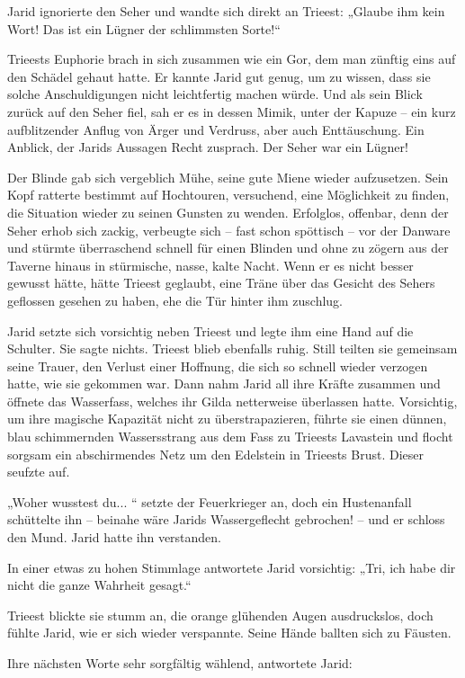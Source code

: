 Jarid ignorierte den Seher und wandte sich direkt an Trieest: „Glaube ihm kein Wort! Das ist ein Lügner der schlimmsten Sorte!“

Trieests Euphorie brach in sich zusammen wie ein Gor, dem man zünftig eins auf den Schädel gehaut hatte. Er kannte Jarid gut genug, um zu wissen, dass sie solche Anschuldigungen nicht leichtfertig machen würde. Und als sein Blick zurück auf den Seher fiel, sah er es in dessen Mimik, unter der Kapuze – ein kurz aufblitzender Anflug von Ärger und Verdruss, aber auch Enttäuschung. Ein Anblick, der Jarids Aussagen Recht zusprach. Der Seher war ein Lügner!

Der Blinde gab sich vergeblich Mühe, seine gute Miene wieder aufzusetzen. Sein Kopf ratterte bestimmt auf Hochtouren, versuchend, eine Möglichkeit zu finden, die Situation wieder zu seinen Gunsten zu wenden. Erfolglos, offenbar, denn der Seher erhob sich zackig, verbeugte sich – fast schon spöttisch – vor der Danware und stürmte überraschend schnell für einen Blinden und ohne zu zögern aus der Taverne hinaus in stürmische, nasse, kalte Nacht. Wenn er es nicht besser gewusst hätte, hätte Trieest geglaubt, eine Träne über das Gesicht des Sehers geflossen gesehen zu haben, ehe die Tür hinter ihm zuschlug.

Jarid setzte sich vorsichtig neben Trieest und legte ihm eine Hand auf die Schulter. Sie sagte nichts. Trieest blieb ebenfalls ruhig. Still teilten sie gemeinsam seine Trauer, den Verlust einer Hoffnung, die sich so schnell wieder verzogen hatte, wie sie gekommen war. Dann nahm Jarid all ihre Kräfte zusammen und öffnete das Wasserfass, welches ihr Gilda netterweise überlassen hatte. Vorsichtig, um ihre magische Kapazität nicht zu überstrapazieren, führte sie einen dünnen, blau schimmernden Wassersstrang aus dem Fass zu Trieests Lavastein und flocht sorgsam ein abschirmendes Netz um den Edelstein in Trieests Brust. Dieser seufzte auf.

„Woher wusstest du... “ setzte der Feuerkrieger an, doch ein Hustenanfall schüttelte ihn – beinahe wäre Jarids Wassergeflecht gebrochen! – und er schloss den Mund. Jarid hatte ihn verstanden.

In einer etwas zu hohen Stimmlage antwortete Jarid vorsichtig: „Tri, ich habe dir nicht die ganze Wahrheit gesagt.“

Trieest blickte sie stumm an, die orange glühenden Augen ausdruckslos, doch fühlte Jarid, wie er sich wieder verspannte. Seine Hände ballten sich zu Fäusten.

Ihre nächsten Worte sehr sorgfältig wählend, antwortete Jarid:

